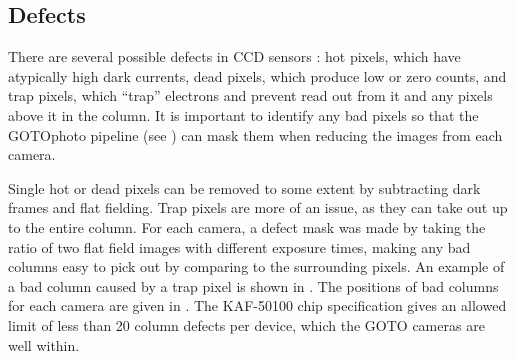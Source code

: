 \subsection{Defects}
\label{sec:defects}
\begin{colsection}

There are several possible defects in CCD sensors \citep{CCDs}: hot pixels, which have atypically high dark currents, dead pixels, which produce low or zero counts, and trap pixels, which ``trap'' electrons and prevent read out from it and any pixels above it in the column. It is important to identify any bad pixels so that the GOTOphoto pipeline (see ) can mask them when reducing the images from each camera.

Single hot or dead pixels can be removed to some extent by subtracting dark frames and flat fielding. Trap pixels are more of an issue, as they can take out up to the entire column. For each camera, a defect mask was made by taking the ratio of two flat field images with different exposure times, making any bad columns easy to pick out by comparing to the surrounding pixels. An example of a bad column caused by a trap pixel is shown in . The positions of bad columns for each camera are given in . The KAF-50100 chip specification gives an allowed limit of less than 20 column defects per device, which the GOTO cameras are well within.


\end{colsection}
